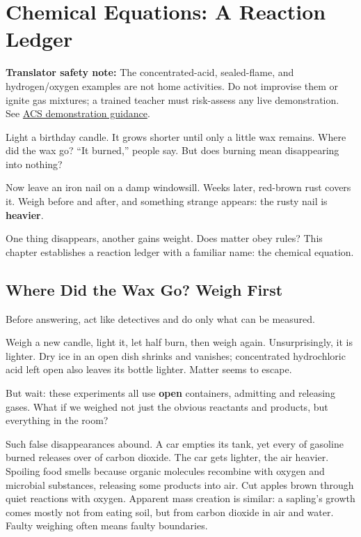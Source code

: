 \chapter{Chemical Equations: A Reaction Ledger}

\begin{kaichang}
\textbf{Translator safety note:} The concentrated-acid, sealed-flame, and hydrogen/oxygen examples are not home activities. Do not improvise them or ignite gas mixtures; a trained teacher must risk-assess any live demonstration. See \href{https://institute.acs.org/acs-center/lab-safety/education-training/safer-experiments.html}{ACS demonstration guidance}.

Light a birthday candle. It grows shorter until only a little wax remains. Where did the wax go? ``It burned,'' people say. But does burning mean disappearing into nothing?

Now leave an iron nail on a damp windowsill. Weeks later, red-brown rust covers it. Weigh before and after, and something strange appears: the rusty nail is \textbf{heavier}.

One thing disappears, another gains weight. Does matter obey rules? This chapter establishes a reaction ledger with a familiar name: the chemical equation.
\end{kaichang}

\section{Where Did the Wax Go? Weigh First}

Before answering, act like detectives and do only what can be measured.

Weigh a new candle, light it, let half burn, then weigh again. Unsurprisingly, it is lighter. Dry ice in an open dish shrinks and vanishes; concentrated hydrochloric acid left open also leaves its bottle lighter. Matter seems to escape.

But wait: these experiments all use \textbf{open} containers, admitting and releasing gases. What if we weighed not just the obvious reactants and products, but everything in the room?

Such false disappearances abound. A car empties its tank, yet every  of gasoline burned releases over  of carbon dioxide. The car gets lighter, the air heavier. Spoiling food smells because organic molecules recombine with oxygen and microbial substances, releasing some products into air. Cut apples brown through quiet reactions with oxygen. Apparent mass creation is similar: a sapling's growth comes mostly not from eating soil, but from carbon dioxide in air and water. Faulty weighing often means faulty boundaries.

